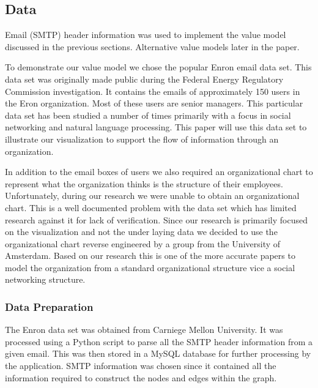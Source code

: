 \message{ !name(FinalPaper.tex)}\documentclass[journal]{vgtc}                %
\begin{document}
\subsection{Data}
Email (SMTP) header information was used to implement the value model discussed in the previous sections.  Alternative value models later in the paper.

To demonstrate our value model we chose the popular Enron email data set.  This data set was originally made public during the Federal Energy Regulatory Commission investigation.  It contains the emails of approximately 150 users in the Eron organization.  Most of these users are senior managers.  This particular data set has been studied a number of times primarily with a focus in social networking and natural language processing.  This paper will use this data set to illustrate our visualization to support the flow of information through an organization.  

In addition to the email boxes of users we also required an organizational chart to represent what the organization thinks is the structure of their employees.  Unfortunately, during our research we were unable to obtain an organizational chart.  This is a well documented problem with the data set which has limited research against it for lack of verification.  Since our research is primarily focused on the visualization and not the under laying data we decided to use the organizational chart reverse engineered by a group from the University of Amsterdam\cite{enronorgchart}.  Based on our research this is one of the more accurate papers to model the organization from a standard organizational structure vice a social networking structure.

\subsubsection{Data Preparation}

The Enron data set was obtained from Carniege Mellon University.  It was processed using a Python script to parse all the SMTP header information from a given email.  This was then stored in a MySQL database for further processing by the application.  SMTP information was chosen since it contained all the information required to construct the nodes and edges within the graph.  
\end{document}
